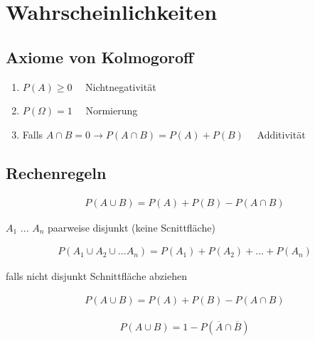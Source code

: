 \documentclass[10pt,a4paper]{article}
\begin{document}
\twocolumn
\pagestyle{fancy}
\section{Wahrscheinlichkeiten}
  \subsection{Axiome von Kolmogoroff}
  \begin{enumerate}[(K1)]
      \item $P(A) \geq 0$ \ \ Nichtnegativität
      \item $P(\Omega) = 1$ \ \ Normierung
      \item Falls $A \cap B = 0 \rightarrow P(A\cap B)=P(A)+P(B) $ \ \ Additivität
  \end{enumerate}
  
  \subsection{Rechenregeln}
  \begin{mdframed}[style=exercise]
    \begin{align}
        P(A \cup B ) = P(A) + P(B) - P(A \cap B )
    \end{align}
  \end{mdframed}
    $A_1$ ... $A_n$ paarweise disjunkt (keine Scnittfläche)
  \begin{mdframed}[style=exercise]
    \begin{align}
        P(A_1 \cup A_2 \cup ... A_n) = P(A_1) + P(A_2) + ... +P(A_n)
    \end{align}
  \end{mdframed}
  falls nicht disjunkt Schnittfläche abziehen
  \begin{mdframed}[style=exercise]
    \begin{align}
        P(A \cup B ) = P(A) + P(B) - P(A\cap B)
    \end{align}
  \end{mdframed}
  
  \begin{mdframed}[style=exercise]
    \begin{align}
        P(A \cup B ) = 1 - P(\overline{A} \cap \overline{B})
    \end{align}
  \end{mdframed}
\end{document}
